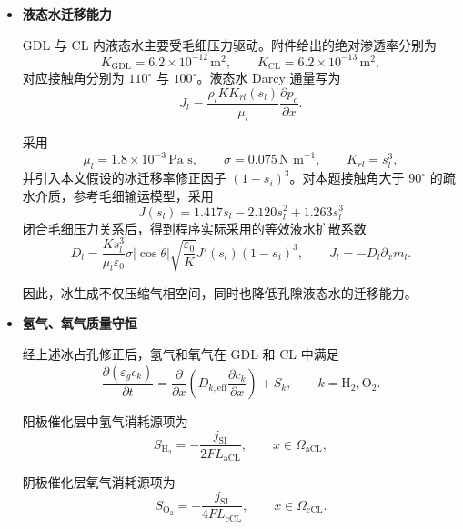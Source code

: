 \documentclass[bwprint]{gmcmthesis}
\numberwithin{equation}{section}
\numberwithin{figure}{section}
\begin{document}
\begin{itemize}
 由于非线性关系的存在，
\[
\langle (1 - s_i)^{3.5} \rangle \neq (1 - \langle s_i \rangle)^{3.5},
\]
因此模型直接根据局部冰状态计算有效面积，而不以平均冰饱和度代替局部修正。

\item \textbf {液态水迁移能力}

GDL 与 CL 内液态水主要受毛细压力驱动。附件给出的绝对渗透率分别为
\[
K_{\text{GDL}} = 6.2 \times 10^{-12} \, \text{m}^2, \qquad K_{\text{CL}} = 6.2 \times 10^{-13} \, \text{m}^2,
\]
对应接触角分别为 \(110^\circ\) 与 \(100^\circ\)。液态水 Darcy 通量写为
\begin{equation}
J_l = \frac{\rho_l K K_{rl}(s_l)}{\mu_l} \frac{\partial p_c}{\partial x}. \label{eq:src:4-48}
\end{equation}

采用
\[
\mu_l = 1.8 \times 10^{-3} \, \text{Pa s}, \qquad \sigma = 0.075 \, \text{N m}^{-1}, \qquad K_{rl} = s_l^3,
\]
并引入本文假设的冰迁移率修正因子 \((1 - s_i)^3\)。对本题接触角大于 $90^\circ$ 的疏水介质，参考毛细输运模型\cite{pasaogullari2004}，采用
\begin{equation}
J(s_l) = 1.417s_l - 2.120s_l^2 + 1.263s_l^3 \label{eq:src:4-49}
\end{equation}
闭合毛细压力关系后，得到程序实际采用的等效液水扩散系数
\begin{equation}
D_l = \frac{K s_l^3}{\mu_l \varepsilon_0} \sigma |\cos \theta| \sqrt{\frac{\varepsilon_0}{K}} J'(s_l)(1 - s_i)^3, \qquad J_l = -D_l \partial_x m_l. \label{eq:src:4-50}
\end{equation}

因此，冰生成不仅压缩气相空间，同时也降低孔隙液态水的迁移能力。

\item \textbf {氢气、氧气质量守恒}

经上述冰占孔修正后，氢气和氧气在 GDL 和 CL 中满足
\begin{equation}
\frac{\partial(\varepsilon_g c_k)}{\partial t} = \frac{\partial}{\partial x} \left( D_{k,\text{eff}} \frac{\partial c_k}{\partial x} \right) + S_k, \qquad k = \text{H}_2, \text{O}_2. \label{eq:src:4-51}
\end{equation}

阳极催化层中氢气消耗源项为
\begin{equation}
S_{\text{H}_2} = -\frac{j_{\mathrm{SI}}}{2F L_{\text{aCL}}}, \qquad x \in \Omega_{\text{aCL}}, \label{eq:src:4-52}
\end{equation}

阴极催化层氧气消耗源项为
\begin{equation}
S_{\text{O}_2} = -\frac{j_{\mathrm{SI}}}{4F L_{\text{cCL}}}, \qquad x \in \Omega_{\text{cCL}}. \label{eq:src:4-53}
\end{equation}


\end{itemize}
\end{document}
